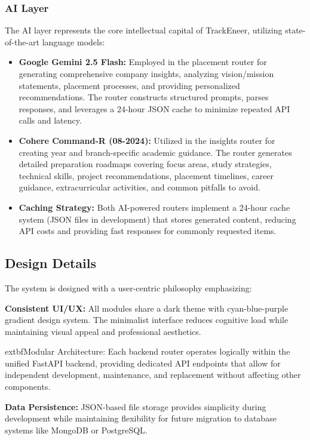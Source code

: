 \documentclass[12pt]{article}
\begin{document}
\subsubsection{AI Layer}
The AI layer represents the core intellectual capital of TrackEneer, utilizing state-of-the-art language models:
\begin{itemize}
    \item \textbf{Google Gemini 2.5 Flash:} Employed in the placement router for generating comprehensive company insights, analyzing vision/mission statements, placement processes, and providing personalized recommendations. The router constructs structured prompts, parses responses, and leverages a 24-hour JSON cache to minimize repeated API calls and latency.

    \item \textbf{Cohere Command-R (08-2024):} Utilized in the insights router for creating year and branch-specific academic guidance. The router generates detailed preparation roadmaps covering focus areas, study strategies, technical skills, project recommendations, placement timelines, career guidance, extracurricular activities, and common pitfalls to avoid.

    \item \textbf{Caching Strategy:} Both AI-powered routers implement a 24-hour cache system (JSON files in development) that stores generated content, reducing API costs and providing fast responses for commonly requested items.
\end{itemize}

\subsection{Design Details}
The system is designed with a user-centric philosophy emphasizing:

\textbf{Consistent UI/UX:} All modules share a dark theme with cyan-blue-purple gradient design system. The minimalist interface reduces cognitive load while maintaining visual appeal and professional aesthetics.

	extbf{Modular Architecture:} Each backend router operates logically within the unified FastAPI backend, providing dedicated API endpoints that allow for independent development, maintenance, and replacement without affecting other components.

\textbf{Data Persistence:} JSON-based file storage provides simplicity during development while maintaining flexibility for future migration to database systems like MongoDB or PostgreSQL.
\end{document}
